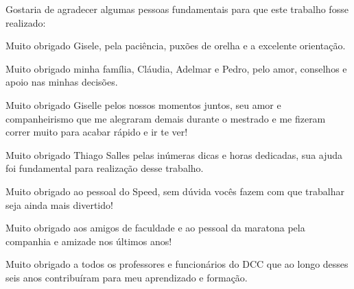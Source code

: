
Gostaria de agradecer algumas pessoas fundamentais para que este trabalho fosse realizado:

Muito obrigado Gisele, pela paciência, puxões de orelha e a excelente orientação.

Muito obrigado minha família, Cláudia, Adelmar e Pedro, pelo amor, conselhos e apoio nas minhas decisões.

Muito obrigado Giselle pelos nossos momentos juntos, seu amor e companheirismo que me alegraram demais durante o mestrado e me fizeram correr muito para acabar rápido e ir te ver! 

Muito obrigado Thiago Salles pelas inúmeras dicas e horas dedicadas, sua ajuda foi fundamental para realização desse trabalho.

Muito obrigado ao pessoal do Speed, sem dúvida vocês fazem com que trabalhar seja ainda mais divertido!

Muito obrigado aos amigos de faculdade e ao pessoal da maratona pela companhia e amizade nos últimos anos!

Muito obrigado a todos os professores e funcionários do \textsc{DCC} que ao longo desses seis anos contribuíram para meu aprendizado e formação.

